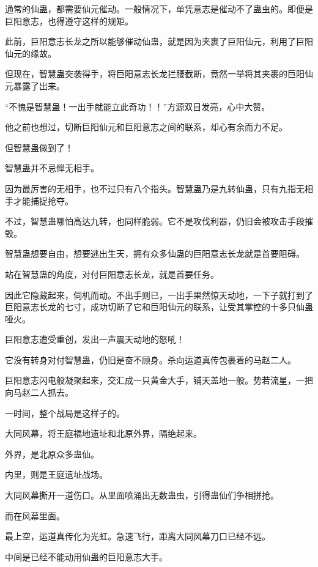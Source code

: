 
\begin{this_body}

通常的仙蛊，都需要仙元催动。一般情况下，单凭意志是催动不了蛊虫的。即便是巨阳意志，也得遵守这样的规矩。

此前，巨阳意志长龙之所以能够催动仙蛊，就是因为夹裹了巨阳仙元，利用了巨阳仙元的缘故。

但现在，智慧蛊突袭得手，将巨阳意志长龙拦腰截断，竟然一举将其夹裹的巨阳仙元暴露了出来。

“不愧是智慧蛊！一出手就能立此奇功！！”方源双目发亮，心中大赞。

他之前也想过，切断巨阳仙元和巨阳意志之间的联系，却心有余而力不足。

但智慧蛊做到了！

智慧蛊并不忌惮无相手。

因为最厉害的无相手，也不过只有八个指头。智慧蛊乃是九转仙蛊，只有九指无相手才能捕捉抢夺。

不过，智慧蛊哪怕高达九转，也同样脆弱。它不是攻伐利器，仍旧会被攻击手段摧毁。

智慧蛊想要自由，想要逃出生天，拥有众多仙蛊的巨阳意志长龙就是首要阻碍。

站在智慧蛊的角度，对付巨阳意志长龙，就是首要任务。

因此它隐藏起来，伺机而动。不出手则已，一出手果然惊天动地，一下子就打到了巨阳意志长龙的七寸，成功切断了它和巨阳仙元的联系，让受其掌控的十多只仙蛊哑火。

巨阳意志遭受重创，发出一声震天动地的怒吼！

它没有转身对付智慧蛊，仍旧是奋不顾身。杀向运道真传包裹着的马赵二人。

巨阳意志闪电般凝聚起来，交汇成一只黄金大手，铺天盖地一般。势若流星，一把向马赵二人抓去。

一时间，整个战局是这样子的。

大同风幕，将王庭福地遗址和北原外界，隔绝起来。

外界，是北原众多蛊仙。

内里，则是王庭遗址战场。

大同风幕撕开一道伤口。从里面喷涌出无数蛊虫，引得蛊仙们争相拼抢。

而在风幕里面。

最上空，运道真传化为光虹。急速飞行，距离大同风幕刀口已经不远。

中间是已经不能动用仙蛊的巨阳意志大手。


\end{this_body}
